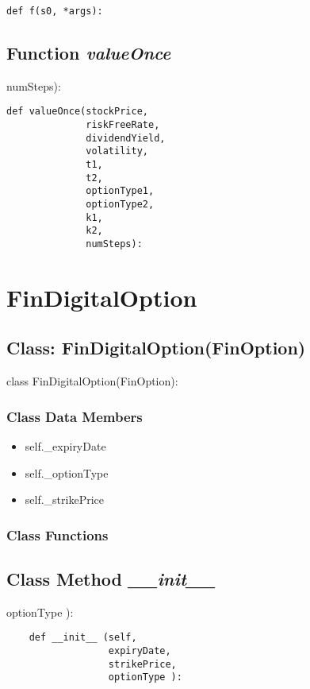 \documentclass[twoside,11pt]{book}
\begin{document}
\begin{lstlisting}
def f(s0, *args):
\end{lstlisting}

\subsection{Function {\it valueOnce}}
numSteps):

\begin{lstlisting}
def valueOnce(stockPrice,
              riskFreeRate,
              dividendYield,
              volatility,
              t1,
              t2,
              optionType1,
              optionType2,
              k1,
              k2,
              numSteps):
\end{lstlisting}

\newpage
\section{FinDigitalOption}

\subsection{Class: FinDigitalOption(FinOption)}
class FinDigitalOption(FinOption):

\subsubsection{Class Data Members}
\begin{itemize}
\item{self.\_expiryDate}
\item{self.\_optionType}
\item{self.\_strikePrice}
\end{itemize}

\subsubsection{Class Functions}

\subsection{Class Method {\it \_\_init\_\_ }}
optionType ):

\begin{lstlisting}
    def __init__ (self,
                  expiryDate,
                  strikePrice,
                  optionType ):
\end{lstlisting}
\end{document}
